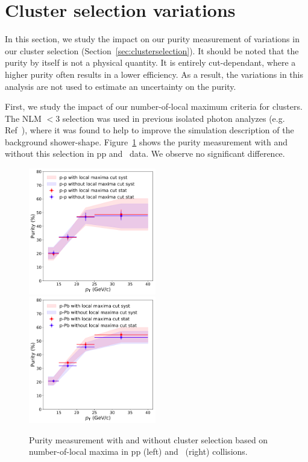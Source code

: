 \section{Cluster selection variations}
\label{sec:clustercutselectionvariation}
In this section, we study the impact on our purity measurement of variations in our cluster selection (Section~\ref{sec:clusterselection}). It should be noted that the purity by itself is not a physical quantity. It is entirely cut-dependant, where a higher purity often results in a lower efficiency. As a result, the variations in this analysis are not used to estimate an uncertainty on the purity.

First, we study the impact of our number-of-local maximum criteria for clusters. The NLM $<3$ selection was used in previous isolated photon analyzes (e.g. Ref~\cite{Acharya:2019jkx,Erwann}), where it was found to help to improve the simulation description of the background shower-shape. Figure~\ref{fig:numberoflocalmaxima} shows the purity measurement with and without this selection in pp and \pPb~data. We observe no significant difference.

\begin{figure}
	\center
	\includegraphics[width=0.495\textwidth]{G-H_New/dPhi_to_0/NLMvariation_pp.png}
	\includegraphics[width=0.495\textwidth]{NLMvariation_pPb.png}
	\caption{Purity measurement with and without cluster selection based on number-of-local maxima in pp (left) and \pPb~(right) collisions.}
	\label{fig:numberoflocalmaxima}
\end{figure}

